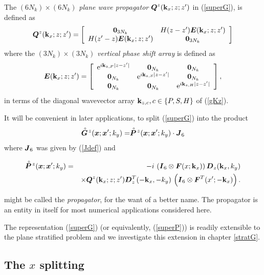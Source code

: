 The $(6N_k)\times (6N_k)$ {\em plane wave propagator\/} 
${\mbox{\boldmath$\mit Q$\unboldmath}}^{z}({\bf k}_{x};z;z^{\prime})$ in (\ref{superG}),
is defined  as
\begin{equation} \label{Qdef}
{\mbox{\boldmath$\mit Q$\unboldmath}}^{z}({\bf k}_x;z;z^{\prime})=
\left[{\begin{array}{cc}{\bf 0}_{3N_k}&H(z-{z}^{\prime}){\mbox{\boldmath$\mit E$\unboldmath}}({\bf k}_x;z;{z}^{\prime})\\
H(z^{\prime}-{z}){\mbox{\boldmath$\mit E$\unboldmath}}({\bf k}_x;z;{z}^{\prime})&{\bf 0}_{3N_k}\end{array}}\right]
\end{equation}
where the $(3N_k)\times (3N_k)$ {\em vertical phase shift array\/} is 
defined as
\[
{\mbox{\boldmath$\mit E$\unboldmath}}({\bf k}_x;z;{z}^{\prime})=\left[{\begin{array}{ccc}
{\rm e}^{i{\bf k}_{z,P}|z-{z}^{\prime}|}&{\bf 0}_{N_k}&{\bf 0}_{N_k}\\ 
{\bf 0}_{N_k}&{\rm e}^{ 
i{\bf k}_{z,S}|z-{z}^{\prime}|}&{\bf 0}_{N_k}\\ {\bf 0}_{N_k}&{\bf 0}_{N_k}&{\rm e}^{ 
i{\bf k}_{z,H}|z-{z}^{\prime}|}\end{array}}\right] ,
\]
in terms of the diagonal wavevector array ${\bf k}_{z,c}, c\in\{P,S,H  
\}$ of (\ref{gKz}).

It will be convenient in later applications,  to split (\ref{superG}) into the product
\[
\stackrel{\scriptscriptstyle _{\,\,\circ}}{ \mbox{\boldmath$\mit G$\unboldmath}}\!{}^{z}({\mbox{\boldmath$\mit x$\unboldmath}};{\mbox{\boldmath$\mit x$\unboldmath}}^{\prime};k_y)=
\stackrel{\scriptscriptstyle _{\,\,\circ}}{ \mbox{\boldmath$\mit P$\unboldmath}}\!{}^{z}({\mbox{\boldmath$\mit x$\unboldmath}};{\mbox{\boldmath$\mit x$\unboldmath}}^{\prime};k_y)\cdot{\mbox{\boldmath$\mit J$\unboldmath}}_6
\]
where ${\mbox{\boldmath$\mit J$\unboldmath}}_6$ was given by (\ref{Jdef}) and
\begin{samepage}
\begin{eqnarray} \label{superP}
\stackrel{\scriptscriptstyle _{\,\,\circ}}{ \mbox{\boldmath$\mit P$\unboldmath}}\!{}^{z}({\mbox{\boldmath$\mit x$\unboldmath}};{\mbox{\boldmath$\mit x$\unboldmath}}^{\prime};k_y)
&=&- i\,\left({\mbox{\boldmath$\mit I$\unboldmath}}_6\otimes 
{\mbox{\boldmath$\mit F$\unboldmath}}(x;{\bf k}_{x})  \right) {\mbox{\boldmath$\mit D$\unboldmath}}_{z}({\bf k}_{x},{k}_{y})\nonumber\\
&& \times
{\mbox{\boldmath$\mit Q$\unboldmath}}^{z}({\bf k}_{x};z;z^{\prime}){\mbox{\boldmath$\mit D$\unboldmath}}_{z}^{T}(-{\bf k}_{x},-{k}_{y})
\,\left({\mbox{\boldmath$\mit I$\unboldmath}}_6\otimes {\mbox{\boldmath$\mit F$\unboldmath}}^{T}(x^{\prime};-{\bf k}_{x})  \right).
\end{eqnarray} 
\end{samepage}
might be called the {\em propagator\/}, for the want of a better name. The 
propagator is an entity in itself for most numerical applications 
considered here.

The representation (\ref{superG}) (or equivalently, (\ref{superP})) is readily extensible 
to the plane stratified problem and we investigate this extension in 
chapter {\ref{stratG}}. 

\subsection{The $x$ splitting }\label{secxsplit}


